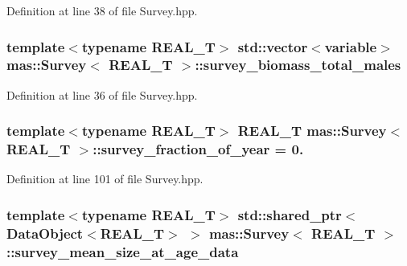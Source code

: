 Definition at line 38 of file Survey.\-hpp.

\hypertarget{structmas_1_1_survey_ab6e2c544df4e59bc1b4169132dc598b6}{
\subsubsection[{survey\-\_\-biomass\-\_\-total\-\_\-males}]{\setlength{\rightskip}{0pt plus 5cm}template$<$typename R\-E\-A\-L\-\_\-\-T$>$ std\-::vector$<${\bf variable}$>$ {\bf mas\-::\-Survey}$<$ R\-E\-A\-L\-\_\-\-T $>$\-::survey\-\_\-biomass\-\_\-total\-\_\-males}}\label{structmas_1_1_survey_ab6e2c544df4e59bc1b4169132dc598b6}


Definition at line 36 of file Survey.\-hpp.

\hypertarget{structmas_1_1_survey_a60c73865d0f6db4aa33cfd314b77882e}{
\subsubsection[{survey\-\_\-fraction\-\_\-of\-\_\-year}]{\setlength{\rightskip}{0pt plus 5cm}template$<$typename R\-E\-A\-L\-\_\-\-T$>$ R\-E\-A\-L\-\_\-\-T {\bf mas\-::\-Survey}$<$ R\-E\-A\-L\-\_\-\-T $>$\-::survey\-\_\-fraction\-\_\-of\-\_\-year = 0.}}\label{structmas_1_1_survey_a60c73865d0f6db4aa33cfd314b77882e}


Definition at line 101 of file Survey.\-hpp.

\hypertarget{structmas_1_1_survey_a32474f16bef5d94a531f52dbd91b2305}{
\subsubsection[{survey\-\_\-mean\-\_\-size\-\_\-at\-\_\-age\-\_\-data}]{\setlength{\rightskip}{0pt plus 5cm}template$<$typename R\-E\-A\-L\-\_\-\-T$>$ std\-::shared\-\_\-ptr$<${\bf Data\-Object}$<$R\-E\-A\-L\-\_\-\-T$>$ $>$ {\bf mas\-::\-Survey}$<$ R\-E\-A\-L\-\_\-\-T $>$\-::survey\-\_\-mean\-\_\-size\-\_\-at\-\_\-age\-\_\-data}}\label{structmas_1_1_survey_a32474f16bef5d94a531f52dbd91b2305}


